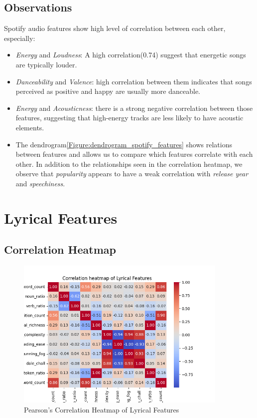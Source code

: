 \subsection*{Observations}
Spotify audio features show high level of correlation between each other, especially:
\begin{itemize}
  \item \textit{Energy} and \textit{Loudness}: A high correlation(0.74) suggest
    that energetic songs are typically louder.
  \item \textit{Danceability} and \textit{Valence}: high correlation between
    them indicates that songs perceived as positive and happy are usually more
    danceable.
  \item \textit{Energy} and \textit{Acousticness}: there is a strong negative
    correlation between those features, suggesting that high-energy tracks are
    less likely to have acoustic elements.
  \item The dendrogram\ref{Figure:dendrogram_spotify_features} shows relations
    between features and allows us to compare which features correlate with
    each other. In addition to the relationships seen in the correlation
    heatmap, we observe that \textit{popularity} appears to have a weak
    correlation with \textit{release year} and \textit{speechiness}.

\end{itemize}




\section{Lyrical Features}

\subsection*{Correlation Heatmap}
\label{sec:correlationheatmapsspotifyfeatures}

\begin{center}
\begin{figure}[H]
  \centering
  \includegraphics[width=4in]{img/corr_heatmap_lyrical.png}
  \caption{Pearson's Correlation Heatmap of Lyrical Features}
  \label{Figure:fig_beh}
\end{figure}
\end{center}


